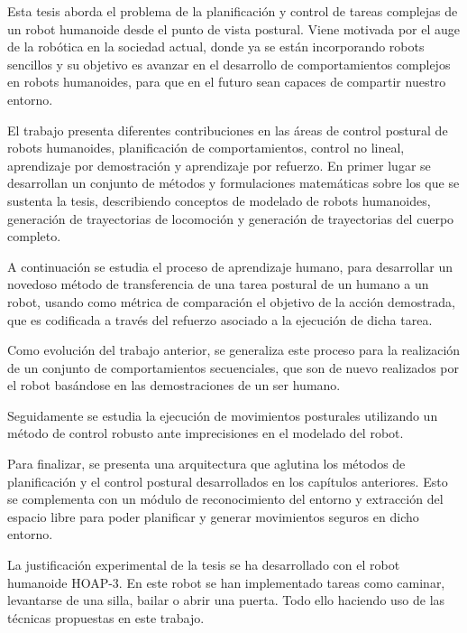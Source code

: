 Esta tesis aborda el problema de la planificación y control de tareas complejas de un robot humanoide desde el punto de vista postural. Viene motivada por el auge  de la robótica en la sociedad actual, donde ya se están incorporando robots sencillos y su objetivo es avanzar en el desarrollo de comportamientos complejos en robots humanoides, para que en el futuro sean capaces de compartir nuestro entorno.

El trabajo presenta diferentes contribuciones en las áreas de control postural de robots humanoides, planificación de comportamientos, control no lineal, aprendizaje por demostración y aprendizaje por refuerzo. En primer lugar se desarrollan un conjunto de métodos y formulaciones matemáticas sobre los que se sustenta la tesis, describiendo conceptos de modelado de robots humanoides, generación de trayectorias de locomoción y generación de trayectorias del cuerpo completo. 

A continuación se estudia el proceso de aprendizaje humano, para desarrollar un novedoso método de transferencia de una tarea postural de un humano a un robot, usando como métrica de comparación el objetivo de la acción demostrada, que es codificada a través del refuerzo asociado a la ejecución de dicha tarea. 

Como evolución del trabajo anterior, se generaliza este proceso para la realización de un conjunto de comportamientos secuenciales, que son de nuevo realizados por el robot basándose en las demostraciones de un ser humano.

Seguidamente se estudia la ejecución de movimientos posturales utilizando un método de control robusto ante imprecisiones en el modelado del robot. 

Para finalizar, se presenta una arquitectura que aglutina los métodos de planificación y el control postural desarrollados en los capítulos anteriores. Esto se complementa con un módulo de reconocimiento del entorno y extracción del espacio libre para poder planificar y generar movimientos seguros en dicho entorno.

La justificación experimental de la tesis se ha desarrollado con el robot humanoide HOAP-3. En este robot se han implementado tareas como caminar, levantarse de una silla, bailar o abrir una puerta. Todo ello haciendo uso de las técnicas propuestas en este trabajo.


%


